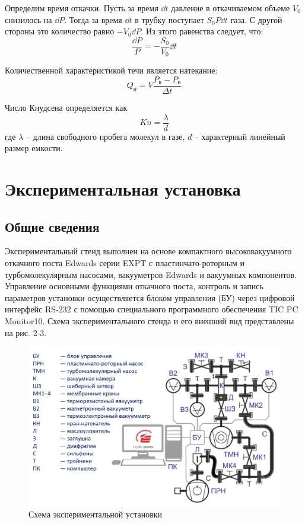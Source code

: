 \documentclass[14pt, a4paper]{report}
\begin{document}
Определим время откачки. Пусть за время $\dd{t}$ давление в откачиваемом объеме $V_0$ снизилось на $\dd{P}$. Тогда за время $\dd{t}$ в трубку поступает $S_0P\dd{t}$ газа. С другой стороны это количество равно $-V_0\dd{P}$. Из этого равенства следует, что:
\[\frac{\dd{P}}{P}=-\frac{S_0}{V_0}\dd{t}\]

Количественной характеристикой течи является натекание:
\[Q_н=V\frac{P_к-P_н}{\Delta t}\]

Число Кнудсена определяется как
\[Kn=\frac{\lambda}{d}\]
где $\lambda$ -- длина свободного пробега молекул в газе, $d$ -- характерный линейный размер емкости.

\section{Экспериментальная установка}

\subsection{Общие сведения}

Экспериментальный стенд выполнен на основе компактного высоковакуумного откачного поста Edwards серии EXPT с пластинчато-роторным и турбомолекулярным насосами, вакууметров Edwards и вакуумных компонентов. Управление основными функциями откачного поста, контроль и запись параметров установки осуществляется блоком управления (БУ) через цифровой интерфейс RS-232 с помощью специального программного обеспечения TIC PC Monitor10. Схема экспериментального стенда и его внешний вид представлены на рис. 2-3.

\begin{figure}[!ht]
\centering
\includegraphics[scale=0.3]{terma5_00.png}
\caption{Схема экспериментальной установки}
\end{figure}
\end{document}
